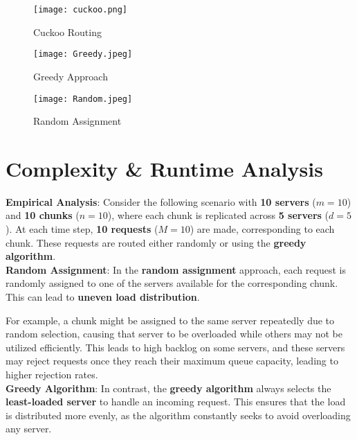 \documentclass{article}
\begin{document}
\begin{figure}[h]  %
    \centering
    \texttt{[image: cuckoo.png]}  %
    \caption{Cuckoo Routing }
    \label{fig:image1}  %
\end{figure}

\begin{figure}[h]
    \centering
    \texttt{[image: Greedy.jpeg]}
    \caption{Greedy Approach }
    \label{fig:image2}
\end{figure}

\begin{figure}[H]
    \centering
    \texttt{[image: Random.jpeg]}
    \caption{Random Assignment}
    \label{fig:image3}
\end{figure}

\section*{Complexity \& Runtime Analysis}

\textbf{Empirical Analysis}:  
Consider the following scenario with \textbf{10 servers} ($m = 10$) and \textbf{10 chunks} ($n = 10$), where each chunk is replicated across \textbf{5 servers} ($d = 5$). At each time step, \textbf{10 requests} ($M = 10$) are made, corresponding to each chunk. These requests are routed either randomly or using the \textbf{greedy algorithm}.\\

\textbf{Random Assignment}:
In the \textbf{random assignment} approach, each request is randomly assigned to one of the servers available for the corresponding chunk. This can lead to \textbf{uneven load distribution}.

For example, a chunk might be assigned to the same server repeatedly due to random selection, causing that server to be overloaded while others may not be utilized efficiently. This leads to high backlog on some servers, and these servers may reject requests once they reach their maximum queue capacity, leading to higher rejection rates.\\

\textbf{Greedy Algorithm}:
In contrast, the \textbf{greedy algorithm} always selects the \textbf{least-loaded server} to handle an incoming request. This ensures that the load is distributed more evenly, as the algorithm constantly seeks to avoid overloading any server.
\end{document}

